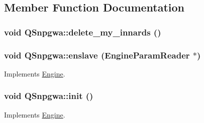 \subsection{Member Function Documentation}
\hypertarget{classQSnpgwa_a30919016fc64635fcf65ca8771af504b}{
\subsubsection[{delete\_\-my\_\-innards}]{\setlength{\rightskip}{0pt plus 5cm}void QSnpgwa::delete\_\-my\_\-innards ()}}
\label{classQSnpgwa_a30919016fc64635fcf65ca8771af504b}
\hypertarget{classQSnpgwa_a2c39271b1001005e6d5a451dbc2fd8bb}{
\subsubsection[{enslave}]{\setlength{\rightskip}{0pt plus 5cm}void QSnpgwa::enslave ({\bf EngineParamReader} $\ast$)}}
\label{classQSnpgwa_a2c39271b1001005e6d5a451dbc2fd8bb}


Implements \hyperlink{classEngine_a023e094182312b1732fe53754c2fe5cb}{Engine}.

\hypertarget{classQSnpgwa_ac228fcbfcba981d48a223e911673e406}{
\subsubsection[{init}]{\setlength{\rightskip}{0pt plus 5cm}void QSnpgwa::init ()}}
\label{classQSnpgwa_ac228fcbfcba981d48a223e911673e406}


Implements \hyperlink{classEngine_aaa054d596fb8ced6e3eb4bee208f8c3d}{Engine}.

